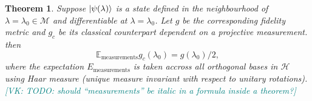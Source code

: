\documentclass[american,aps,pra,reprint,floatfix,nofootinbib,superscriptaddress]{revtex4-2}
\newtheorem{theorem}{Theorem}
\newcommand{\VK}[1]{\textcolor{teal}{[VK: #1]}}
\begin{document}
\begin{theorem}
  \label{th:avggc}
  Suppose $\ket{\psi(\lambda)}$ is a state defined in the
  neighbourhood of $\lambda = \lambda_0 \in \mathcal{M}$ and differentiable at
  $\lambda=\lambda_0$. Let $g$ be the corresponding fidelity metric
  and $g_c$ be its classical counterpart dependent on a projective
  measurement. then
  \begin{equation}
    \label{eq:Emeas}
    \mathbb{E}_{\textrm{measurements}} g_c(\lambda_0) = g(\lambda_0) / 2,
  \end{equation}
where the expectation $E_{\textrm{measurements}}$ is taken accross
all orthogonal bases in $\mathcal{H}$ using Haar measure (unique measure
invariant with respect to unitary rotations).
\VK{TODO: should ``measurements'' be italic in a formula inside a theorem?}
\end{theorem}
\end{document}
